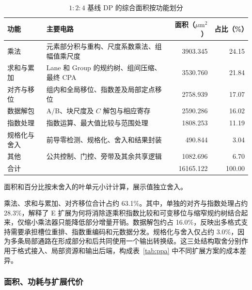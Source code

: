 \documentclass[10.5pt,compsoc,UTF8]{CjC}
\newcommand{\ratio}[3]{\ensuremath{#1\!:\!#2\!:\!#3}}
\newcommand{\tabnote}[1]{\par\smallskip\begin{minipage}{\linewidth}\zihao{5-}#1\end{minipage}}
\begin{document}
\begin{table}[!htbp]
\centering
\caption{\ratio{1}{2}{4} 基线 DP 的综合面积按功能划分}
\label{tab:baseline-area}
\begin{tabularx}{\linewidth}{@{}lYrr@{}}
\toprule
功能 & 主要电路 & 面积（$\mu\mathrm{m}^{2}$） & 占比（\%） \\
\midrule
乘法 & 元素部分积与重构、尺度系数乘法、组幅值乘尺度 & 3903.345 & 24.15 \\
求和与累加 & Lane 和 Group 的规约树、组间压缩、最终 CPA & 3530.760 & 21.84 \\
对齐与移位 & 组内和全局移位、指数差及局部定点移位 & 2758.939 & 17.07 \\
数据解包 & A/B、块尺度及 $C$ 解包与相应寄存 & 2590.286 & 16.02 \\
指数处理 & 指数运算、最大值比较与范围处理 & 1808.253 & 11.19 \\
规格化与舍入 & 前导零检测、规格化、舍入和结果封装 & 490.844 & 3.04 \\
其他 & 公共控制、门控、旁带及其余共享逻辑 & 1082.696 & 6.70 \\
\midrule
合计 & & 16165.122 & 100.00 \\
\bottomrule
\end{tabularx}
\tabnote{面积和百分比按未舍入的叶单元小计计算，展示值独立舍入。}
\end{table}

乘法、求和与累加、对齐移位合计占约 63.1\%。其中，单独的对齐与指数处理占约 28.3\%，解释了 E 扩展为何将消除逐乘积指数比较和可变移位与缩窄规约树结合起来，仅缩小乘法器只能降低部分增量开销。数据解包约占 16.0\%，反映出多格式支持需要承担槽位重排、指数重编码和元数据分发。规格化与舍入仅占约 3.0\%，因为多条局部通路在形成部分和后共同使用一个输出转换级。这三处结构取舍分别作用于格式接入、局部资源和输出后端，构成表~\ref{tab:ppa} 中不同扩展方案的成本差异。

\subsubsection{面积、功耗与扩展代价}
\end{document}
